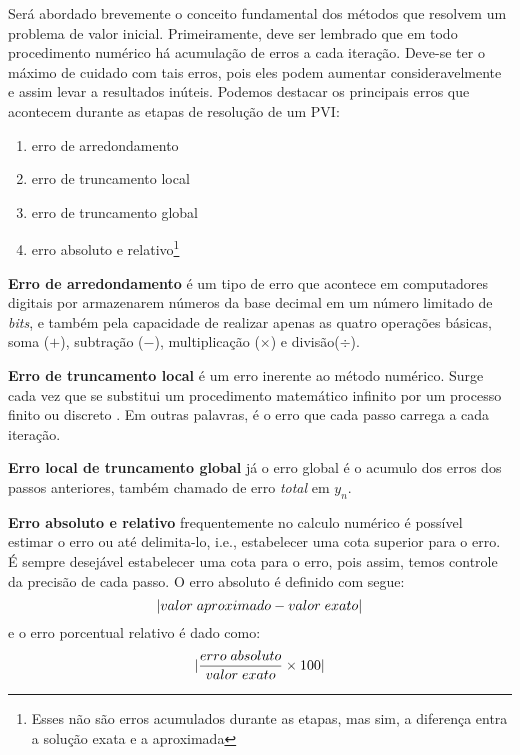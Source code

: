 Será abordado brevemente o conceito fundamental dos métodos que resolvem um 
problema de valor inicial. Primeiramente, deve ser lembrado que em todo 
procedimento numérico há acumulação de erros a cada iteração. Deve-se ter o máximo
de cuidado com tais erros, pois eles podem aumentar consideravelmente
e assim levar a resultados inúteis. Podemos destacar os principais erros  
que acontecem durante as etapas de resolução de um PVI:
\begin{enumerate}[label=\roman*.]
\item erro de arredondamento
\item erro de truncamento local
\item erro de truncamento global
\item erro absoluto e relativo\footnote{Esses não são erros acumulados durante
as etapas, mas sim, a diferença entra a solução exata e a aproximada}
\end{enumerate}

\textbf{Erro de arredondamento} é um tipo de erro que acontece em
computadores digitais por armazenarem números da base decimal em um número limitado
de \emph{bits}, e também pela capacidade de realizar apenas as quatro operações
básicas, soma ($+$), subtração ($-$), multiplicação ($\times$) e divisão($\div$).

\textbf{Erro de truncamento local} é um erro inerente ao método numérico. Surge
cada vez que se substitui um procedimento matemático infinito por um processo 
finito ou discreto \cite{sperandio2003calculo}. Em outras palavras, é o erro
que cada passo carrega a cada iteração.

\textbf{Erro local de truncamento global} já o erro global é o acumulo dos erros
dos passos anteriores, também chamado de erro \emph{total} em $y_{n}$.

\textbf{Erro absoluto e relativo} frequentemente no calculo numérico é possível
estimar o erro ou até delimita-lo, i.e., estabelecer uma cota superior para o erro.
É sempre desejável estabelecer uma cota para o erro, pois assim, temos controle
da precisão de cada passo. O erro absoluto é definido com segue:
\begin{equation*}
\lvert valor \thickspace aproximado - valor \thickspace exato\rvert
\end{equation*}
e o erro porcentual relativo é dado como:
\begin{equation*}
\lvert\frac{erro \thickspace absoluto}{valor \thickspace exato} \times 100\rvert
\end{equation*}

